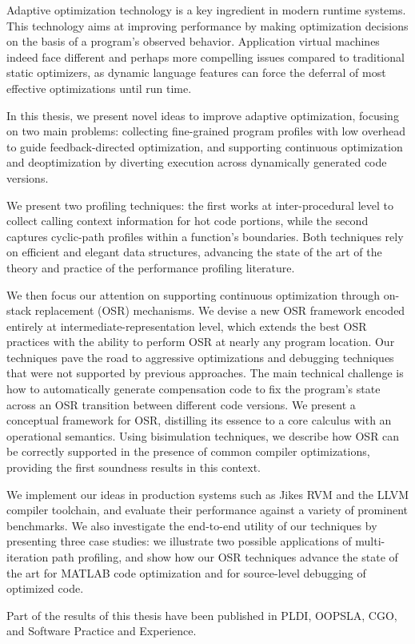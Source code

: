 Adaptive optimization technology is a key ingredient in modern runtime systems. This technology aims at improving performance by making optimization decisions on the basis of a program's observed behavior. Application virtual machines indeed face different and perhaps more compelling issues compared to traditional static optimizers, as dynamic language features can force the deferral of most effective optimizations until run time.

In this thesis, we present novel ideas to improve adaptive optimization, focusing on two main problems: collecting fine-grained program profiles with low overhead to guide feedback-directed optimization, and supporting continuous optimization and deoptimization by diverting execution across dynamically generated code versions.

We present two profiling techniques: the first works at inter-procedural level to collect calling context information for hot code portions, while the second captures cyclic-path profiles within a function's boundaries. Both techniques rely on efficient and elegant data structures, advancing the state of the art of the theory and practice of the performance profiling literature.

We then focus our attention on supporting continuous optimization through on-stack replacement (OSR) mechanisms. We devise a new OSR framework encoded entirely at intermediate-representation level, which extends the best OSR practices with the ability to perform OSR at nearly any program location. Our techniques pave the road to aggressive optimizations and debugging techniques that were not supported by previous approaches. The main technical challenge is how to automatically generate compensation code to fix the program's state across an OSR transition between different code versions. We present a conceptual framework for OSR, distilling its essence to a core calculus with an operational semantics. Using bisimulation techniques, we describe how OSR can be correctly supported in the presence of common compiler optimizations, providing the first soundness results in this context.

We implement our ideas in production systems such as Jikes RVM and the LLVM compiler toolchain, and evaluate their performance against a variety of prominent benchmarks. We also investigate the end-to-end utility of our techniques by presenting three case studies: we illustrate two possible applications of multi-iteration path profiling, and show how our OSR techniques advance the state of the art for MATLAB code optimization and for source-level debugging of optimized code.

Part of the results of this thesis have been published in PLDI, OOPSLA, CGO, and Software Practice and Experience.